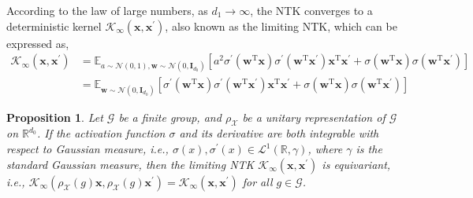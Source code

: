 \documentclass{article}
\newcommand{\T}{\mathrm{T}}
\newcommand{\G}{\mathcal{G}}
\newcommand{\X}{\mathcal{X}}
\theoremstyle{plain}
\newtheorem{proposition}[theorem]{Proposition}
\theoremstyle{definition}
\theoremstyle{remark}
\theoremstyle{remark}
\begin{document}
According to the law of large numbers, as $d_1 \to \infty$, the NTK converges to a deterministic kernel $\mathcal{K}_{\infty}(\mathbf{x}, \mathbf{x}^\prime)$, also known as the limiting NTK, which can be expressed as,
\begin{align} \label{eq: ntk_infty}
  \mathcal{K}_{\infty}(\mathbf{x}, \mathbf{x}^\prime) 
  & = \mathbb{E}_{a \sim \mathcal{N}(0,1), \mathbf{w} \sim \mathcal{N}(0, \mathbf{I}_{d_0})}\left[a^2 \sigma^\prime\left(\mathbf{w}^{\T} \mathbf{x}\right) \sigma^\prime\left(\mathbf{w}^{\T} \mathbf{x}^\prime\right) \mathbf{x}^{\T} \mathbf{x}^{\prime} + \sigma(\mathbf{w}^{\T} \mathbf{x}) \sigma\left(\mathbf{w}^{\T} \mathbf{x}^\prime\right)\right] \nonumber \\
  & = \mathbb{E}_{\mathbf{w} \sim \mathcal{N}(0, \mathbf{I}_{d_0})}\left[ \sigma^\prime\left(\mathbf{w}^{\T} \mathbf{x}\right) \sigma^\prime\left(\mathbf{w}^{\T} \mathbf{x}^\prime\right) \mathbf{x}^{\T} \mathbf{x}^{\prime} + \sigma(\mathbf{w}^{\T} \mathbf{x}) \sigma\left(\mathbf{w}^{\T} \mathbf{x}^\prime\right)\right]
\end{align}

\begin{proposition} \label{prop: equivariant_ntk}
  Let $\G$ be a finite group, and $\rho_{\X}$ be a unitary representation of $\G$ on $\mathbb{R}^{d_0}$. 
  If the activation function $\sigma$ and its derivative are both integrable with respect to Gaussian measure, i.e., $\sigma(x), \sigma^\prime(x) \in \mathcal{L}^1(\mathbb{R}, \gamma)$, where $\gamma$ is the standard Gaussian measure, then the limiting NTK $\mathcal{K}_{\infty}(\mathbf{x}, \mathbf{x}^\prime)$ is equivariant, i.e., $\mathcal{K}_{\infty}(\rho_{\X}(g) \mathbf{x}, \rho_{\X}(g) \mathbf{x}^\prime) = \mathcal{K}_{\infty}(\mathbf{x}, \mathbf{x}^\prime)$ for all $g \in \G$.
\end{proposition}
\end{document}
